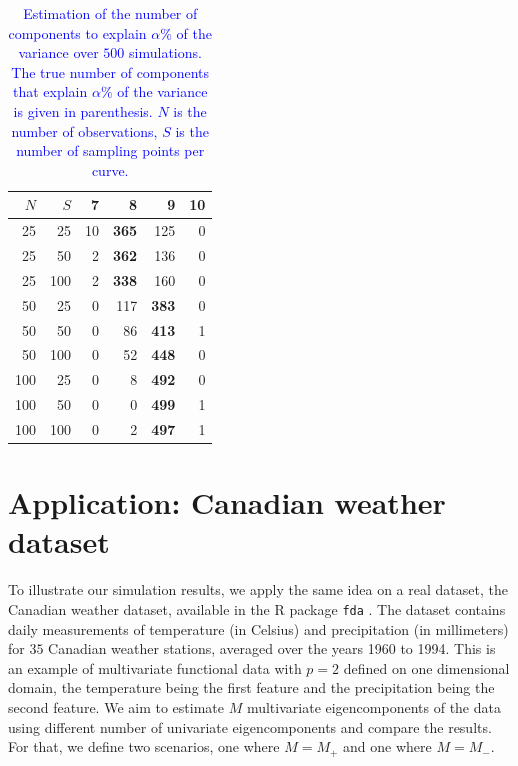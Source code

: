 \begin{table}
\begin{subtable}[h]{0.45\textwidth}
\begin{tabular}{rr|rrrr}
    $N$ & $S$ & 7 & 8 & 9 & 10\\
    \hline
    25 & 25 & 10 & \textbf{365} & 125 & 0\\
    25 & 50 & 2 & \textbf{362} & 136 & 0\\
    25 & 100 & 2 & \textbf{338} & 160 & 0\\
    50 & 25 & 0 & 117 & \textbf{383} & 0\\
    50 & 50 & 0 & 86 & \textbf{413} & 1\\
    50 & 100 & 0 & 52 & \textbf{448} & 0\\
    100 & 25 & 0 & 8 & \textbf{492} & 0\\
    100 & 50 & 0 & 0 & \textbf{499} & 1\\
    100 & 100 & 0 & 2 & \textbf{497} & 1\\
\end{tabular}
\caption{$\alpha = 99\%$ ($\text{NPC}_{\alpha} = 10$)}
\end{subtable}
\caption{\textcolor{blue}{Estimation of the number of components to explain $\alpha\%$ of the variance over $500$ simulations. The true number of components that explain $\alpha\%$ of the variance is given in parenthesis. $N$ is the number of observations, $S$ is the number of sampling points per curve.}}
\label{fig:npc_estim}
\end{table}



\section{Application: Canadian weather dataset} %
\label{sec:application_canadian_weather_dataset}

To illustrate our simulation results, we apply the same idea on a real dataset, the Canadian weather dataset, available in the \textsf{R} package \texttt{fda} \citep{ramsayFdaFunctionalData2023}. The dataset contains daily measurements of temperature (in Celsius) and precipitation (in millimeters) for $35$ Canadian weather stations, averaged over the years 1960 to 1994. This is an example of multivariate functional data with $p = 2$ defined on one dimensional domain, the temperature being the first feature and the precipitation being the second feature. We aim to estimate $M$ multivariate eigencomponents of the data using different number of univariate eigencomponents and compare the results. For that, we define two scenarios, one where $M = M_{+}$ and one where $M = M_{-}$.

